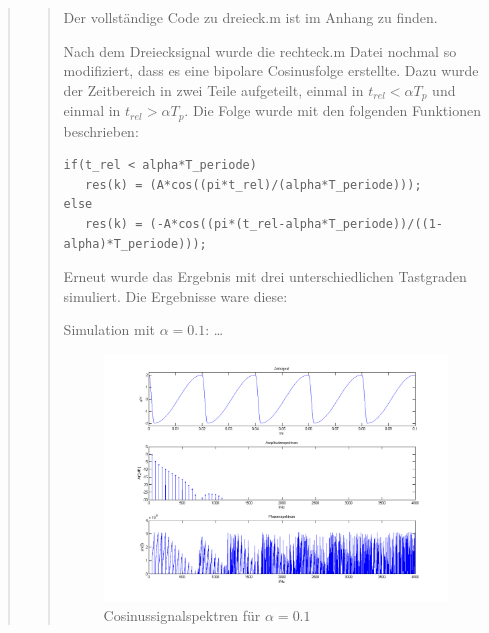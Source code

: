\begin{quote}
\begin{quote}
\begin{center}
		\end{center}
		
		\vspace{1em}
		
		Der vollständige Code zu dreieck.m ist im Anhang zu finden.
		
		\vspace{1em}
		
		Nach dem Dreiecksignal wurde die rechteck.m Datei nochmal so modifiziert, dass
		es eine bipolare Cosinusfolge erstellte.
		Dazu wurde der Zeitbereich in zwei Teile aufgeteilt, einmal in $t_{rel} <
		\alpha T_p$ und einmal in $t_{rel} > \alpha T_p$. Die Folge wurde mit den
		folgenden Funktionen beschrieben:\\
		
\begin{lstlisting}
if(t_rel < alpha*T_periode)
   res(k) = (A*cos((pi*t_rel)/(alpha*T_periode)));
else
   res(k) = (-A*cos((pi*(t_rel-alpha*T_periode))/((1-alpha)*T_periode)));
\end{lstlisting} 
		
		Erneut wurde das Ergebnis mit drei unterschiedlichen Tastgraden simuliert. Die
		Ergebnisse ware diese:
		
		Simulation mit $\alpha = 0.1$: \ldots
	
		\begin{center}
	    
	           \begin{figure}[H]
    			\centering
    				\includegraphics[scale=0.5]{cos_alpha1.png}
    				\caption{Cosinussignalspektren für $\alpha = 0.1$}
    			\end{figure}	
    			\caption{}	
		

\end{center}
\end{quote}
\end{quote}
